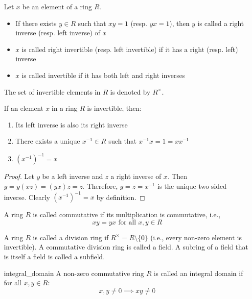 \begin{definition}
  Let $x$ be an element of a ring $R$.
  \begin{itemize}
    \item If there exists $y \in R$ such that $xy = 1$ (resp. $yx = 1$), then $y$ is called a right inverse (resp. left inverse) of $x$
    \item $x$ is called right invertible (resp. left invertible) if it has a right (resp. left) inverse
    \item $x$ is called invertible if it has both left and right inverses
  \end{itemize}
  The set of invertible elements in $R$ is denoted by $R^\times$.
\end{definition}

\begin{proposition}
  If an element $x$ in a ring $R$ is invertible, then:
  \begin{enumerate}
    \item Its left inverse is also its right inverse
    \item There exists a unique $x^{-1} \in R$ such that $x^{-1}x = 1 = xx^{-1}$
    \item $(x^{-1})^{-1} = x$
  \end{enumerate}
\end{proposition}

\begin{proof}
  Let $y$ be a left inverse and $z$ a right inverse of $x$.
  Then $y = y(xz) = (yx)z = z$.
  Therefore, $y = z = x^{-1}$ is the unique two-sided inverse.
  Clearly $(x^{-1})^{-1} = x$ by definition.
\end{proof}

\begin{definition}
  A ring $R$ is called commutative if its multiplication is commutative, i.e.,
  \[
    xy = yx \text{ for all } x,y \in R
  \]
\end{definition}

\begin{definition}
  A ring $R$ is called a division ring if $R^\times = R \setminus \{0\}$ (i.e., every non-zero element is invertible).
  A commutative division ring is called a field.
  A subring of a field that is itself a field is called a subfield.
\end{definition}

\begin{definition}{integral_domain}
  A non-zero commutative ring $R$ is called an integral domain if for all $x,y \in R$:
  \[
    x,y \neq 0 \implies xy \neq 0
  \]
\end{definition}

